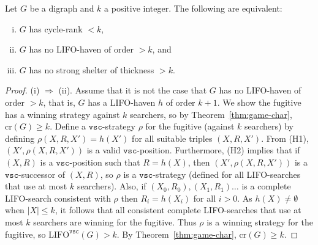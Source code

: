 \documentclass{llncs}
\newcommand{\cycr}[1]{\textrm{cr}(#1)}
\newcommand{\lifo}[1]{\textrm{LIFO}^{#1}}
\newcommand{\vscvar}{\texttt{vsc}}
\begin{document}
\begin{theorem}\label{thm:min-max}
Let $G$ be a digraph and $k$ a positive integer.  The following are equivalent:
\begin{enumerate}[(i) ]
\item $G$ has cycle-rank $<k$, 
\item $G$ has no LIFO-haven of order $> k$, and
\item $G$ has no strong shelter of thickness $> k$.
\end{enumerate}
\end{theorem}
\begin{proof}
(i) $\Rightarrow$ (ii).  Assume that it is not the case that $G$ has no LIFO-haven of order $>k$, that is, $G$ has a LIFO-haven $h$ of order $k+1$.  We show the fugitive has a winning strategy against $k$ searchers, so by Theorem~\ref{thm:game-char}, $\cycr{G} \geq k$.  Define a $\vscvar$-strategy $\rho$ for the fugitive (against $k$ searchers) by defining $\rho(X,R,X') = h(X')$ for all suitable triples $(X,R,X')$.  From (H1), $(X',\rho(X,R,X'))$ is a valid $\vscvar$-position.  Furthermore, (H2) implies that if $(X,R)$ is a $\vscvar$-position such that $R = h(X)$, then $(X',\rho(X,R,X'))$ is a $\vscvar$-successor of $(X,R)$, so $\rho$ is a $\vscvar$-strategy (defined for all LIFO-searches that use at most $k$ searchers).  Also,  if $(X_0,R_0), (X_1,R_1) \ldots$ is a complete LIFO-search consistent with $\rho$ then $R_i = h(X_i)$ for all $i>0$.  As $h(X) \neq \emptyset$ when $|X|\leq k$, it follows that all consistent complete LIFO-searches that use at most $k$ searchers are winning for the fugitive.  Thus $\rho$ is a winning strategy for the fugitive, so $\lifo{\vscvar}(G) > k$.  By Theorem~\ref{thm:game-char}, $\cycr{G} \geq k$.


\end{proof}
\end{document}
